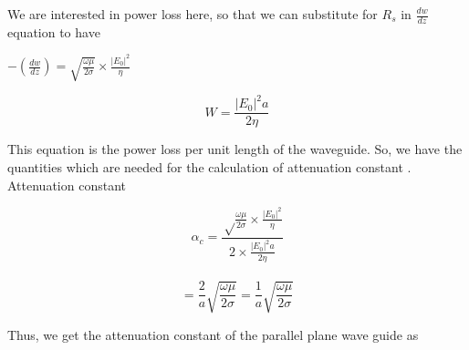 We are interested in power loss here, so that we can substitute for $R_s$ in $\frac{dw}{dz}$ equation to have\\
\begin{center}
	$-(\frac{dw}{dz})=\sqrt{\frac{\omega\mu}{2\sigma}}\times\frac{|E_0|^2}{\eta}$
\end{center}

\begin{equation}
W=\frac{|E_0|^2 a}{2\eta}
\end{equation}

This equation is the power loss per unit length of the waveguide. So, we have the quantities which are needed for the  calculation of attenuation constant .
Attenuation constant 
\begin{center}
	$$\alpha_c = \frac{\sqrt\frac{\omega\mu}{2 \sigma}\times\frac{|E_0|^2}{\eta}}{2 \times \frac{|E_0|^2 a}{2 \eta}}$$\\
	
	$$= \frac{2}{a}\sqrt{\frac{\omega\mu}{2\sigma}}=\frac{1}{a}\sqrt{\frac{\omega\mu}{2\sigma}}$$	
\end{center}



Thus, we get the attenuation constant of the parallel plane wave guide as

